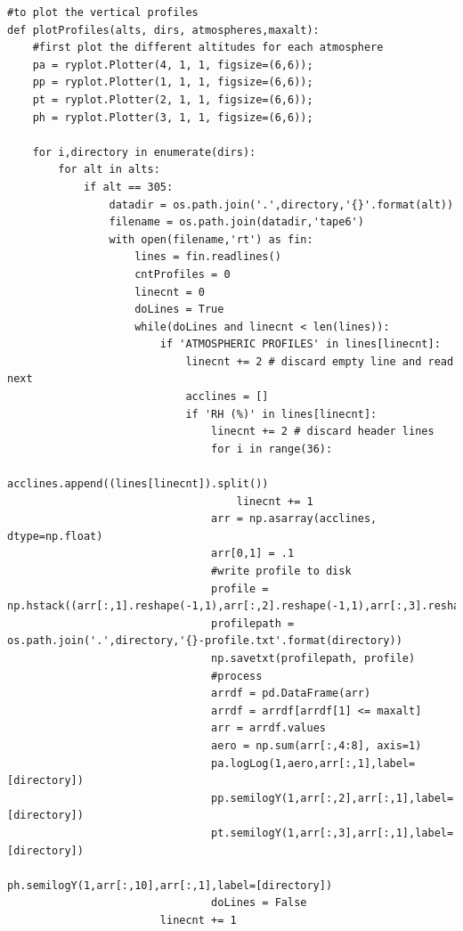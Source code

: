 \documentclass{workpackage}
\begin{document}
\begin{lstlisting}[style=incellstyle,caption={Code Listing in cell 15 \label{lst:autolistingcell15}}]
#to plot the vertical profiles
def plotProfiles(alts, dirs, atmospheres,maxalt):
    #first plot the different altitudes for each atmosphere
    pa = ryplot.Plotter(4, 1, 1, figsize=(6,6));
    pp = ryplot.Plotter(1, 1, 1, figsize=(6,6));
    pt = ryplot.Plotter(2, 1, 1, figsize=(6,6));
    ph = ryplot.Plotter(3, 1, 1, figsize=(6,6));
    
    for i,directory in enumerate(dirs):
        for alt in alts:
            if alt == 305:
                datadir = os.path.join('.',directory,'{}'.format(alt))
                filename = os.path.join(datadir,'tape6')
                with open(filename,'rt') as fin:
                    lines = fin.readlines()
                    cntProfiles = 0
                    linecnt = 0
                    doLines = True
                    while(doLines and linecnt < len(lines)):
                        if 'ATMOSPHERIC PROFILES' in lines[linecnt]:
                            linecnt += 2 # discard empty line and read next
                            acclines = []
                            if 'RH (%)' in lines[linecnt]:
                                linecnt += 2 # discard header lines
                                for i in range(36):
                                    acclines.append((lines[linecnt]).split())
                                    linecnt += 1
                                arr = np.asarray(acclines, dtype=np.float)
                                arr[0,1] = .1
                                #write profile to disk
                                profile = np.hstack((arr[:,1].reshape(-1,1),arr[:,2].reshape(-1,1),arr[:,3].reshape(-1,1),arr[:,10].reshape(-1,1)))
                                profilepath = os.path.join('.',directory,'{}-profile.txt'.format(directory))
                                np.savetxt(profilepath, profile)
                                #process
                                arrdf = pd.DataFrame(arr)
                                arrdf = arrdf[arrdf[1] <= maxalt]
                                arr = arrdf.values
                                aero = np.sum(arr[:,4:8], axis=1)
                                pa.logLog(1,aero,arr[:,1],label=[directory])
                                pp.semilogY(1,arr[:,2],arr[:,1],label=[directory])
                                pt.semilogY(1,arr[:,3],arr[:,1],label=[directory])
                                ph.semilogY(1,arr[:,10],arr[:,1],label=[directory])
                                doLines = False
                        linecnt += 1
        

\end{lstlisting}
\end{document}
